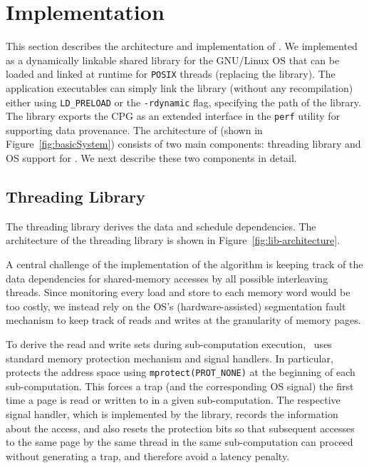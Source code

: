 \section{Implementation}
\label{sec:implementation}



This section describes the architecture and implementation of \projecttitle. We implemented \projecttitle as a dynamically linkable shared library for the GNU/Linux OS that can be loaded and linked  at runtime for {\tt POSIX} threads (replacing the \pthreads library). The application executables can simply link the library (without any recompilation) either using {\tt LD\_PRELOAD} or the {\tt -rdynamic} flag, specifying the path of the \projecttitle library.  The \projecttitle library exports the CPG as an extended interface in the {\tt perf} utility for supporting data provenance.   The architecture of \projecttitle (shown in Figure~\ref{fig:basicSystem}) consists of two main components: threading library and OS support for \intelpt. We next describe these two components in detail.




\subsection{Threading Library}
\label{sec:impl-lib}
The threading library derives the data and schedule dependencies. The architecture of the threading library is shown in Figure~\ref{fig:lib-architecture}. 

 
 A central challenge of the implementation of the
algorithm is keeping track of the data dependencies for shared-memory accesses
by all possible interleaving threads. Since monitoring every load and store to
each memory word would be too costly, we instead rely on the OS's
(hardware-assisted) segmentation fault mechanism to keep track of reads and writes at the granularity of memory pages.

To derive the read and write sets during sub-computation execution,  \projecttitle~uses standard memory protection  mechanism and signal handlers. In particular, \projecttitle protects the address space using {\tt mprotect(PROT\_NONE)} at the beginning of each sub-computation. This forces a trap (and the corresponding OS signal) the first time a page is read or written to in a given sub-computation. The respective signal handler, which is implemented by the \projecttitle library, records the information about the access, and also resets the protection bits so that subsequent accesses to the same page by the same thread in the same sub-computation can proceed without generating a trap, and therefore avoid a
latency penalty.  

